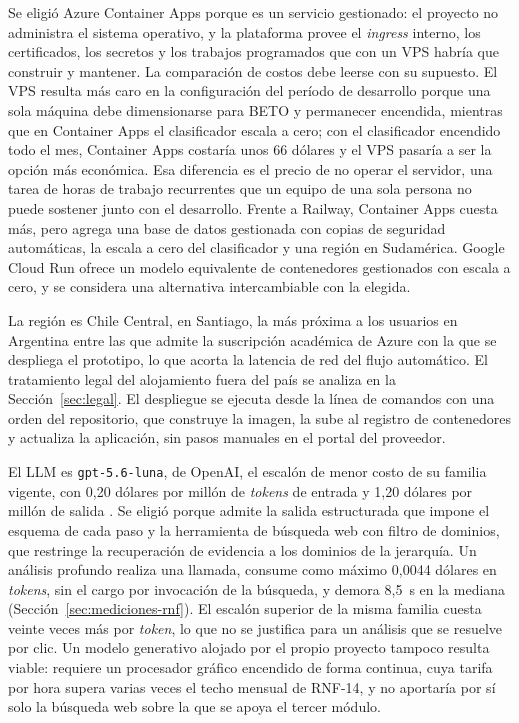 Se eligió Azure Container Apps porque es un servicio gestionado: el proyecto no administra el sistema operativo, y la plataforma provee el \textit{ingress} interno, los certificados, los secretos y los trabajos programados que con un VPS habría que construir y mantener. La comparación de costos debe leerse con su supuesto. El VPS resulta más caro en la configuración del período de desarrollo porque una sola máquina debe dimensionarse para BETO y permanecer encendida, mientras que en Container Apps el clasificador escala a cero; con el clasificador encendido todo el mes, Container Apps costaría unos 66 dólares y el VPS pasaría a ser la opción más económica. Esa diferencia es el precio de no operar el servidor, una tarea de horas de trabajo recurrentes que un equipo de una sola persona no puede sostener junto con el desarrollo. Frente a Railway, Container Apps cuesta más, pero agrega una base de datos gestionada con copias de seguridad automáticas, la escala a cero del clasificador y una región en Sudamérica. Google Cloud Run ofrece un modelo equivalente de contenedores gestionados con escala a cero, y se considera una alternativa intercambiable con la elegida.

La región es Chile Central, en Santiago, la más próxima a los usuarios en Argentina entre las que admite la suscripción académica de Azure con la que se despliega el prototipo, lo que acorta la latencia de red del flujo automático. El tratamiento legal del alojamiento fuera del país se analiza en la Sección~\ref{sec:legal}. El despliegue se ejecuta desde la línea de comandos con una orden del repositorio, que construye la imagen, la sube al registro de contenedores y actualiza la aplicación, sin pasos manuales en el portal del proveedor.

El LLM es \texttt{gpt-5.6-luna}, de OpenAI, el escalón de menor costo de su familia vigente, con 0,20 dólares por millón de \textit{tokens} de entrada y 1,20 dólares por millón de salida \parencite{OpenAI2026}. Se eligió porque admite la salida estructurada que impone el esquema de cada paso y la herramienta de búsqueda web con filtro de dominios, que restringe la recuperación de evidencia a los dominios de la jerarquía. Un análisis profundo realiza una llamada, consume como máximo 0,0044 dólares en \textit{tokens}, sin el cargo por invocación de la búsqueda, y demora 8,5~s en la mediana (Sección~\ref{sec:mediciones-rnf}). El escalón superior de la misma familia cuesta veinte veces más por \textit{token}, lo que no se justifica para un análisis que se resuelve por clic. Un modelo generativo alojado por el propio proyecto tampoco resulta viable: requiere un procesador gráfico encendido de forma continua, cuya tarifa por hora supera varias veces el techo mensual de RNF-14, y no aportaría por sí solo la búsqueda web sobre la que se apoya el tercer módulo.

